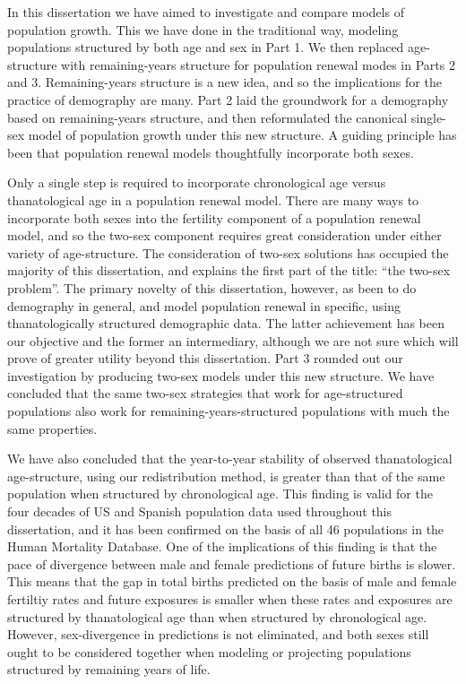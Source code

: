 
In this dissertation we have aimed to investigate and compare models of
population growth. This we have done in the traditional way, modeling populations 
structured by both age and sex in Part 1. We then replaced age-structure with remaining-years
structure for population renewal modes in Parts 2 and 3. Remaining-years
structure is a new idea, and so the implications for the practice of demography are many. Part
2 laid the groundwork for a demography based on remaining-years
structure, and then reformulated the canonical single-sex model of population
growth under this new structure. A guiding principle has been that
population renewal models thoughtfully incorporate both sexes. 

Only a single step is required to incorporate chronological age versus
thanatological age in a population renewal model. There are many ways to incorporate both sexes
into the fertility component of a population renewal model, and so the 
two-sex component requires great consideration under either
variety of age-structure. The consideration of two-sex solutions has occupied
the majority of this dissertation, and explains the first part of 
the title: ``the two-sex problem''. The primary
novelty of this dissertation, however, as been to do demography in general, and
model population renewal in specific, using thanatologically structured
demographic data. The latter achievement has been our objective and the former
an intermediary, although we are not sure which will prove of greater utility
beyond this dissertation. Part 3 rounded out our investigation by producing
two-sex models under this new structure. We have concluded that the same two-sex 
strategies that work for age-structured populations also work for
remaining-years-structured populations with much the same properties.

We have also concluded that the year-to-year stability of observed
thanatological age-structure, using our redistribution method, is
greater than that of the same population when structured by
chronological age. This finding is valid for the four decades of US and
Spanish population data used throughout this dissertation, and it has been
confirmed on the basis of all 46 populations in the Human Mortality Database.
One of the implications of this finding is that the pace of
divergence between male and female predictions of future births is slower. This
means that the gap in total births predicted on the basis of male and female fertiltiy rates
and future exposures is smaller when these rates and exposures are structured
by thanatological age than when structured by chronological age. However,
sex-divergence in predictions is not eliminated, and both sexes still ought to
be considered together when modeling or projecting populations structured
by remaining years of life.

